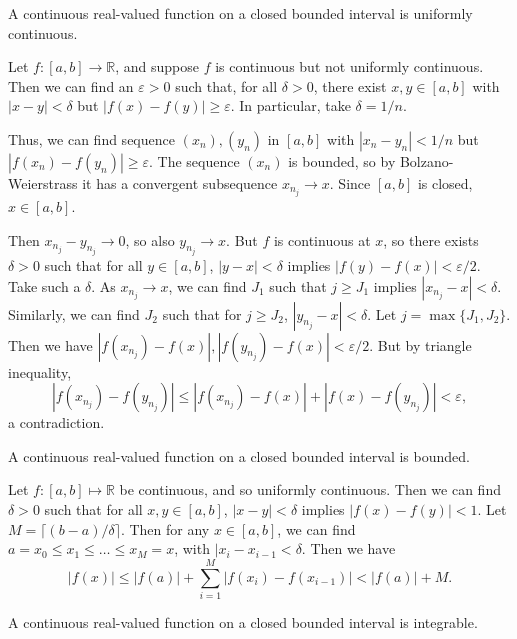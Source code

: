 \documentclass[12pt]{article}
\begin{document}
\begin{theorem}
	A continuous real-valued function on a closed bounded interval is uniformly continuous.
\end{theorem}

\begin{proofbox} Let $f : [a, b] \to \mathbb{R}$, and suppose $f$ is continuous but not uniformly continuous. Then we can find an $\varepsilon > 0$ such that, for all $\delta > 0$, there exist $x, y \in [a, b]$ with $|x - y| < \delta$ but $|f(x) - f(y)| \geq \varepsilon$. In particular, take $\delta = 1/n$.

	Thus, we can find sequence $(x_n), (y_n)$ in $[a, b]$ with $|x_n - y_n| < 1/n$ but $|f(x_n) - f(y_n)| \geq \varepsilon$. The sequence $(x_n)$ is bounded, so by Bolzano-Weierstrass it has a convergent subsequence $x_{n_j} \to x$. Since $[a, b]$ is closed, $x \in [a, b]$.

	Then $x_{n_j} - y_{n_j} \to 0$, so also $y_{n_j} \to x$. But $f$ is continuous at $x$, so there exists $\delta > 0$ such that for all $y \in [a, b]$, $|y - x| < \delta$ implies $|f(y) - f(x)| < \varepsilon/2$. Take such a $\delta$. As $x_{n_j} \to x$, we can find $J_1$ such that $j \geq J_1$ implies $|x_{n_j} - x| < \delta$. Similarly, we can find $J_2$ such that for $j \geq J_2$, $|y_{n_j} - x| < \delta$. Let $j = \max\{J_1, J_2\}$. Then we have $|f(x_{n_j}) - f(x)|, |f(y_{n_j}) - f(x)| < \varepsilon/2$. But by triangle inequality,
	\[
		|f(x_{n_j}) - f(y_{n_j})| \leq |f(x_{n_j}) - f(x)| + |f(x) - f(y_{n_j})| < \varepsilon
	,\]
	a contradiction.
\end{proofbox}

\begin{corollary}
	A continuous real-valued function on a closed bounded interval is bounded.
\end{corollary}

\begin{proofbox}
	Let $f : [a, b] \mapsto \mathbb{R}$ be continuous, and so uniformly continuous. Then we can find $\delta > 0$ such that for all $x, y \in [a, b]$, $|x - y| < \delta$ implies $|f(x) - f(y)| < 1$. Let $M = \lceil (b - a)/\delta \rceil$. Then for any $x \in [a, b]$, we can find $a = x_0 \leq x_1 \leq \ldots \leq x_M = x$, with $|x_{i} - x_{i-1}< \delta$. Then we have
	\[
		|f(x)| \leq |f(a)| + \sum_{i = 1}^{M} |f(x_i) - f(x_{i-1})| < |f(a)| + M
	.\]
\end{proofbox}

\begin{corollary}
	A continuous real-valued function on a closed bounded interval is integrable.
\end{corollary}
\end{document}
